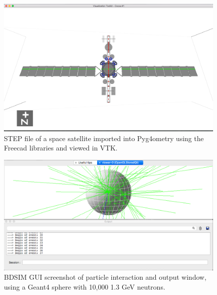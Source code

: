 \documentclass[12pt,a4paper]{article}
\begin{document}
\begin{figure}[h!]
\centering
\includegraphics[scale=0.4]{Images//VTK/sat.png}
\caption[width=\columnwidth]{STEP file of a space satellite imported into Pyg4ometry using the Freecad libraries and viewed in VTK.}
\label{sat}
\end{figure}

\begin{figure}[h!]
\centering
\includegraphics[scale=0.4]{Images//BDSIM//screengrab.png}
\caption[width=\columnwidth]{BDSIM GUI screenshot of particle interaction and output window, using a Geant4 sphere with 10,000 1.3 GeV neutrons.}
\label{screengrab}
\end{figure}


\newpage
\end{document}
